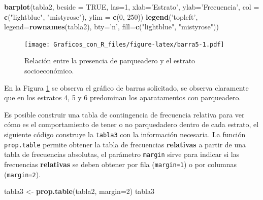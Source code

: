 \documentclass[10pt,]{krantz}
\makeatletter
\newenvironment{Shaded}{\begin{snugshade}}{\end{snugshade}}
\newcommand{\KeywordTok}[1]{\textcolor[rgb]{0.13,0.29,0.53}{\textbf{#1}}}
\newcommand{\DataTypeTok}[1]{\textcolor[rgb]{0.13,0.29,0.53}{#1}}
\newcommand{\DecValTok}[1]{\textcolor[rgb]{0.00,0.00,0.81}{#1}}
\newcommand{\StringTok}[1]{\textcolor[rgb]{0.31,0.60,0.02}{#1}}
\newcommand{\OtherTok}[1]{\textcolor[rgb]{0.56,0.35,0.01}{#1}}
\newcommand{\NormalTok}[1]{#1}
\newenvironment{kframe}{%
\medskip{}
\setlength{\fboxsep}{.8em}
 \def\at@end@of@kframe{}%
 \ifinner\ifhmode%
  \def\at@end@of@kframe{\end{minipage}}%
  \begin{minipage}{\columnwidth}%
 \fi\fi%
 \def\FrameCommand##1{\hskip\@totalleftmargin \hskip-\fboxsep
 \colorbox{shadecolor}{##1}\hskip-\fboxsep
     \hskip-\linewidth \hskip-\@totalleftmargin \hskip\columnwidth}%
 \MakeFramed {\advance\hsize-\width
   \@totalleftmargin\z@ \linewidth\hsize
   \@setminipage}}%
 {\par\unskip\endMakeFramed%
 \at@end@of@kframe}
\renewenvironment{Shaded}{\begin{kframe}}{\end{kframe}}
\makeatother
\begin{document}
\begin{Shaded}
\begin{Highlighting}[]
\KeywordTok{barplot}\NormalTok{(tabla2, }\DataTypeTok{beside =} \OtherTok{TRUE}\NormalTok{, }\DataTypeTok{las=}\DecValTok{1}\NormalTok{, }
        \DataTypeTok{xlab=}\StringTok{'Estrato'}\NormalTok{, }\DataTypeTok{ylab=}\StringTok{'Frecuencia'}\NormalTok{,}
        \DataTypeTok{col =} \KeywordTok{c}\NormalTok{(}\StringTok{"lightblue"}\NormalTok{, }\StringTok{"mistyrose"}\NormalTok{),}
        \DataTypeTok{ylim =} \KeywordTok{c}\NormalTok{(}\DecValTok{0}\NormalTok{, }\DecValTok{250}\NormalTok{))}
\KeywordTok{legend}\NormalTok{(}\StringTok{'topleft'}\NormalTok{, }\DataTypeTok{legend=}\KeywordTok{rownames}\NormalTok{(tabla2), }\DataTypeTok{bty=}\StringTok{'n'}\NormalTok{,}
       \DataTypeTok{fill=}\KeywordTok{c}\NormalTok{(}\StringTok{"lightblue"}\NormalTok{, }\StringTok{"mistyrose"}\NormalTok{))}
\end{Highlighting}
\end{Shaded}

\begin{figure}
\centering
\texttt{[image: Graficos\_con\_R\_files/figure-latex/barra5-1.pdf]}
\caption{\label{fig:barra5}Relación entre la presencia de parqueadero y el
estrato socioeconómico.}
\end{figure}

En la Figura \ref{fig:barra5} se observa el gráfico de barras
solicitado, se observa claramente que en los estratos 4, 5 y 6
predominan los aparatamentos con parqueadero.

Es posible construir una tabla de contingencia de frecuencia relativa
para ver cómo es el comportamiento de tener o no parquedadero dentro de
cada estrato, el siguiente código construye la \texttt{tabla3} con la
información necesaria. La función \texttt{prop.table} permite obtener la
tabla de frecuencias \textbf{relativas} a partir de una tabla de
frecuencias absolutas, el parámetro \texttt{margin} sirve para indicar
si las frecuencias \textbf{relativas} se deben obtener por fila
(\texttt{margin=1}) o por columnas (\texttt{margin=2}).

\begin{Shaded}
\begin{Highlighting}[]
\NormalTok{tabla3 <-}\StringTok{ }\KeywordTok{prop.table}\NormalTok{(tabla2, }\DataTypeTok{margin=}\DecValTok{2}\NormalTok{)}
\NormalTok{tabla3}
\end{Highlighting}
\end{Shaded}
\end{document}
